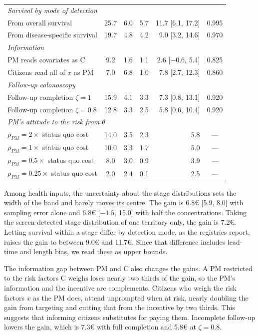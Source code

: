 \documentclass[12pt]{article}
\begin{document}
\begin{table}[h!]
\begin{tabular}{l c c c r c}
\midrule
\multicolumn{6}{l}{\emph{Survival by mode of detection}} \\
From overall survival & 25.7 & 6.0 & 5.7 & 11.7 [6.1, 17.2] & 0.995 \\
From disease-specific survival & 19.7 & 4.8 & 4.2 & 9.0 [3.2, 14.6] & 0.970 \\
\midrule
\multicolumn{6}{l}{\emph{Information}} \\
PM reads covariates as C & 9.2 & 1.6 & 1.1 & 2.6 [$-$0.6, 5.4] & 0.825 \\
Citizens read all of $x$ as PM & 7.0 & 6.8 & 1.0 & 7.8 [2.7, 12.3] & 0.860 \\
\midrule
\multicolumn{6}{l}{\emph{Follow-up colonoscopy}} \\
Follow-up completion $\zeta = 1$ & 15.9 & 4.1 & 3.3 & 7.3 [0.8, 13.1] & 0.920 \\
Follow-up completion $\zeta = 0.8$ & 12.8 & 3.3 & 2.5 & 5.8 [0.6, 10.4] & 0.920 \\
\midrule
\multicolumn{6}{l}{\emph{PM's attitude to the risk from $\theta$}} \\
$\rho_{PM} = 2\times$ status quo cost & 14.0 & 3.5 & 2.3 & 5.8 & --- \\
$\rho_{PM} = 1\times$ status quo cost & 10.0 & 3.3 & 1.7 & 5.0 & --- \\
$\rho_{PM} = 0.5\times$ status quo cost & 8.0 & 3.0 & 0.9 & 3.9 & --- \\
$\rho_{PM} = 0.25\times$ status quo cost & 2.0 & 2.4 & 0.1 & 2.5 & --- \\
\bottomrule
\end{tabular}
\end{table}

Among health inputs, the uncertainty about the stage distributions sets the width of the band and barely moves its centre. The gain is 6.8€ [5.9, 8.0] with sampling error alone and 6.8€ [$-1.5$, 15.0] with half the concentrations. Taking the screen-detected stage distribution of one territory only, the gain is 7.2€. Letting survival within a stage differ by detection mode, as the registries report, raises the gain to between 9.0€ and 11.7€. Since that difference includes lead-time and length bias, we read these as upper bounds.

The information gap between PM and C also changes the gains. A PM restricted to the risk factors C weighs loses nearly two thirds of the gain, so the PM's information and the incentive are complements. Citizens who weigh the risk factors $x$ as the PM does, attend unprompted when at risk, nearly doubling the gain from targeting and cutting that from the incentive by two thirds. This suggests that informing citizens substitutes for paying them. Incomplete follow-up lowers the gain, which is 7.3€ with full completion and 5.8€ at $\zeta = 0.8$.
\end{document}
